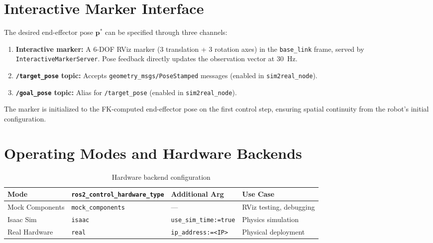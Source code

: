 \documentclass[12pt, a4paper]{article}
\begin{document}
\section{Interactive Marker Interface}
\label{sec:marker}

The desired end-effector pose $\mathbf{p}^*$ can be specified through three channels:

\begin{enumerate}
  \item \textbf{Interactive marker:} A 6-DOF RViz marker (3 translation + 3 rotation
        axes) in the \texttt{base\_link} frame, served by \texttt{InteractiveMarkerServer}.
        Pose feedback directly updates the observation vector at 30~Hz.
  \item \textbf{\texttt{/target\_pose} topic:} Accepts \texttt{geometry\_msgs/PoseStamped}
        messages (enabled in \texttt{sim2real\_node}).
  \item \textbf{\texttt{/goal\_pose} topic:} Alias for \texttt{/target\_pose}
        (enabled in \texttt{sim2real\_node}).
\end{enumerate}

The marker is initialized to the FK-computed end-effector pose on the first control
step, ensuring spatial continuity from the robot's initial configuration.

\section{Operating Modes and Hardware Backends}
\label{sec:modes}

\begin{table}[h]
\centering
\caption{Hardware backend configuration}
\label{tab:modes}
\begin{tabular}{llll}
\toprule
\textbf{Mode} & \textbf{\texttt{ros2\_control\_hardware\_type}} & \textbf{Additional Arg} & \textbf{Use Case} \\
\midrule
Mock Components & \texttt{mock\_components} & — & RViz testing, debugging \\
Isaac Sim       & \texttt{isaac} & \texttt{use\_sim\_time:=true} & Physics simulation \\
Real Hardware   & \texttt{real} & \texttt{ip\_address:=<IP>} & Physical deployment \\
\bottomrule
\end{tabular}
\end{table}
\end{document}
